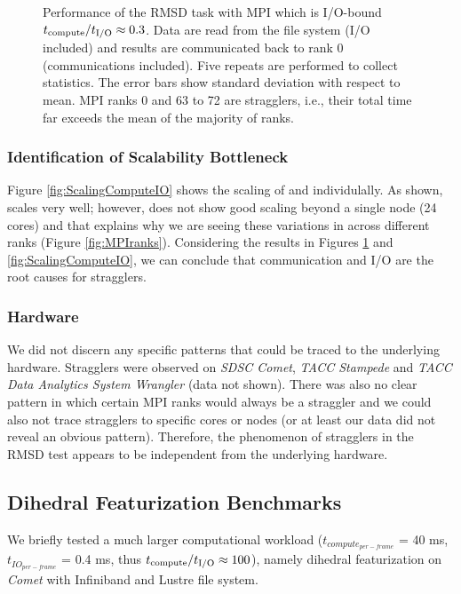 \begin{figure}[ht!]
\caption{Performance of the RMSD task with MPI which is I/O-bound ${t}_{\text{compute}}/{t}_{\text{I/O}} \approx 0.3$.
Data are read from the file system (I/O included) and results are communicated back to
rank 0 (communications included). Five repeats are performed to collect statistics. The error bars show
standard deviation with respect to mean. MPI ranks 0 and 63 to 72 are stragglers, i.e., their total time 
far exceeds the mean of the majority of ranks.}
  
\label{fig:MPIwithIO}
\end{figure} 

\subsubsection*{Identification of Scalability Bottleneck}

Figure \ref{fig:ScalingComputeIO} shows the scaling of \tcomp and \tIO individulally. 
As shown, \tcomp scales very well; however, \tIO does not show good scaling beyond a single node (24 cores) and that explains why we are seeing these variations in \tIO across different ranks (Figure \ref{fig:MPIranks}). 
Considering the results in Figures \ref{fig:MPIwithIO} and \ref{fig:ScalingComputeIO}, we can conclude that communication and I/O are the root causes for stragglers. 

\subsubsection*{Hardware}

We did not discern any specific patterns that could be traced to the underlying hardware. Stragglers were observed on \emph{SDSC Comet},
\emph{TACC Stampede} and \emph{TACC Data Analytics System Wrangler} (data not shown). There was also no clear pattern in which certain MPI
ranks would always be a straggler and we could also not trace stragglers to specific cores or nodes (or at least our data did not
reveal an obvious pattern). Therefore, the phenomenon of stragglers in the RMSD test appears to be independent from the underlying hardware.

\subsection{Dihedral Featurization Benchmarks}
\label{DF}
We briefly tested a much larger computational workload ($t_{compute_{per-frame}}$ = 40 ms, $t_{IO_{per-frame}}$ = 0.4 ms, thus ${t}_{\text{compute}}/{t}_{\text{I/O}} \approx 100$), namely dihedral
featurization on \emph{Comet} with Infiniband and Lustre file system.

